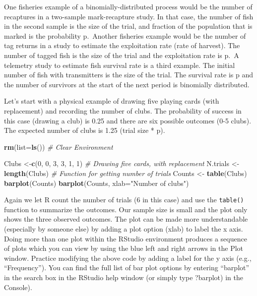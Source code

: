 \documentclass[
]{krantz}
\makeatletter
\newenvironment{Shaded}{\begin{snugshade}}{\end{snugshade}}
\newcommand{\AttributeTok}[1]{\textcolor[rgb]{0.27,0.27,0.27}{#1}}
\newcommand{\CommentTok}[1]{\textcolor[rgb]{0.37,0.37,0.37}{\textit{#1}}}
\newcommand{\DecValTok}[1]{\textcolor[rgb]{0.06,0.06,0.06}{#1}}
\newcommand{\FunctionTok}[1]{\textcolor[rgb]{0.27,0.27,0.27}{\textbf{#1}}}
\newcommand{\NormalTok}[1]{#1}
\newcommand{\OtherTok}[1]{\textcolor[rgb]{0.37,0.37,0.37}{#1}}
\newcommand{\StringTok}[1]{\textcolor[rgb]{0.5,0.5,0.5}{#1}}
\newenvironment{kframe}{%
\medskip{}
\setlength{\fboxsep}{.8em}
 \def\at@end@of@kframe{}%
 \ifinner\ifhmode%
  \def\at@end@of@kframe{\end{minipage}}%
  \begin{minipage}{\columnwidth}%
 \fi\fi%
 \def\FrameCommand##1{\hskip\@totalleftmargin \hskip-\fboxsep
 \colorbox{shadecolor}{##1}\hskip-\fboxsep
     \hskip-\linewidth \hskip-\@totalleftmargin \hskip\columnwidth}%
 \MakeFramed {\advance\hsize-\width
   \@totalleftmargin\z@ \linewidth\hsize
   \@setminipage}}%
 {\par\unskip\endMakeFramed%
 \at@end@of@kframe}
\renewenvironment{Shaded}{\begin{kframe}}{\end{kframe}}
\makeatother
\begin{document}
One fisheries example of a binomially-distributed process would be the number of recaptures in a two-sample mark-recapture study. In that case, the number of fish in the second sample is the size of the trial, and fraction of the population that is marked is the probability p.~Another fisheries example would be the number of tag returns in a study to estimate the exploitation rate (rate of harvest). The number of tagged fish is the size of the trial and the exploitation rate is p.~A telemetry study to estimate fish survival rate is a third example. The initial number of fish with transmitters is the size of the trial. The survival rate is p and the number of survivors at the start of the next period is binomially distributed.

Let's start with a physical example of drawing five playing cards (with replacement) and recording the number of clubs. The probability of success in this case (drawing a club) is 0.25 and there are six possible outcomes (0-5 clubs). The expected number of clubs is 1.25 (trial size * p).

\begin{Shaded}
\begin{Highlighting}[]
\FunctionTok{rm}\NormalTok{(}\AttributeTok{list=}\FunctionTok{ls}\NormalTok{()) }\CommentTok{\# Clear Environment}

\NormalTok{Clubs }\OtherTok{\textless{}{-}}\FunctionTok{c}\NormalTok{(}\DecValTok{0}\NormalTok{, }\DecValTok{0}\NormalTok{, }\DecValTok{3}\NormalTok{, }\DecValTok{3}\NormalTok{, }\DecValTok{1}\NormalTok{, }\DecValTok{1}\NormalTok{)  }\CommentTok{\# Drawing five cards, with replacement}
\NormalTok{N.trials }\OtherTok{\textless{}{-}} \FunctionTok{length}\NormalTok{(Clubs) }\CommentTok{\# Function for getting number of trials}
\NormalTok{Counts }\OtherTok{\textless{}{-}} \FunctionTok{table}\NormalTok{(Clubs)}
\FunctionTok{barplot}\NormalTok{(Counts)}
\FunctionTok{barplot}\NormalTok{(Counts, }\AttributeTok{xlab=}\StringTok{"Number of clubs"}\NormalTok{)}
\end{Highlighting}
\end{Shaded}

Again we let R count the number of trials (6 in this case) and use the \texttt{table()} function to summarize the outcomes. Our sample size is small and the plot only shows the three observed outcomes. The plot can be made more understandable (especially by someone else) by adding a plot option (xlab) to label the x axis. Doing more than one plot within the RStudio environment produces a sequence of plots which you can view by using the blue left and right arrows in the Plot window. Practice modifying the above code by adding a label for the y axis (e.g., ``Frequency''). You can find the full list of bar plot options by entering ``barplot'' in the search box in the RStudio help window (or simply type ?barplot) in the Console).
\end{document}
